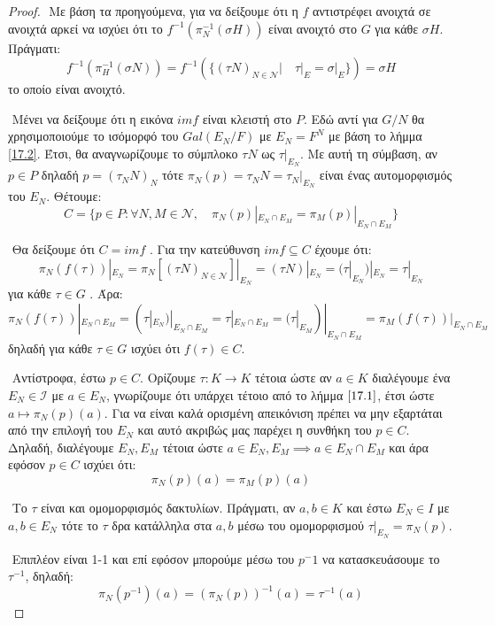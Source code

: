 \documentclass[oneside,a4paper]{article}
\begin{document}
\begin{proof}
$ $\newline
\noindent Με βάση τα προηγούμενα, για να δείξουμε ότι η $f$ αντιστρέφει ανοιχτά σε ανοιχτά αρκεί να ισχύει ότι το $f^{-1} (\pi^{-1}_N (\sigma H))$ είναι ανοιχτό στο $G$ για κάθε $\sigma H$. Πράγματι:
$$f^{-1} (\pi^{-1}_H (\sigma N)) = f^{-1} (\{(\tau N)_{N \in \mathcal{N}} | \quad \tau|_E = \sigma|_E \}) = \sigma H$$
το οποίο είναι ανοιχτό.

$ $\newline
\noindent Μένει να δείξουμε ότι η εικόνα $imf$ είναι κλειστή στο $P$. Εδώ αντί για $G/N$ θα χρησιμοποιούμε το ισόμορφό του $Gal(E_N / F)$ με $E_N = F^N$ με βάση το λήμμα \ref{17.2}. Έτσι, θα αναγνωρίζουμε το σύμπλοκο $\tau N$ ως $\tau|_{E_N}$. Με αυτή τη σύμβαση, αν $p \in P$ δηλαδή $p = (\tau_N N)_{N}$ τότε $\pi_N (p) = \tau_N N = \tau_N |_{E_N}$ είναι ένας αυτομορφισμός του $E_N$. Θέτουμε:
$$C = \{ p \in P: \forall N,M \in \mathcal{N} ,\quad \pi_N (p) |_{E_N \cap E_M} = \pi_M(p)|_{E_N \cap E_M}\}$$

$ $\newline
\noindent Θα δείξουμε ότι $C=imf$ . Για την κατεύθυνση $imf \subseteq C$ έχουμε ότι:
$$\pi_N (f(\tau))|_{E_N} =\pi_N [(\tau N)_{N \in \mathcal{N}}]|_{E_N} = (\tau N) |_{E_N} = (\tau|_{E_N})|_{E_N} = \tau|_{E_N}$$
για κάθε $\tau \in G$ . Άρα:
$$\pi_N (f(\tau))|_{E_N \cap E_M}=(\tau|_{E_N})|_{E_N \cap E_M} = \tau|_{E_N \cap E_M} = (\tau|_{E_M})|_{E_N \cap E_M} =\pi_M (f(\tau))|_{E_N \cap E_M}$$
δηλαδή για κάθε $\tau \in G$ ισχύει ότι $f(\tau) \in C$.

$ $\newline
\noindent Αντίστροφα, έστω $p \in C$. Ορίζουμε $\tau : K \rightarrow K$ τέτοια ώστε αν $a \in K$ διαλέγουμε ένα $E_N \in \mathcal{I}$ με $a \in E_N$, γνωρίζουμε ότι υπάρχει τέτοιο από το λήμμα $\ref{17.1}$, έτσι ώστε $a \mapsto \pi_N (p) (a)$. Για να είναι καλά ορισμένη απεικόνιση πρέπει να μην εξαρτάται από την επιλογή του $E_N$ και αυτό ακριβώς μας παρέχει η συνθήκη του $p \in C$.  Δηλαδή, διαλέγουμε $E_N, E_M$ τέτοια ώστε $a \in E_N, E_M \implies a \in E_N \cap E_M$ και άρα εφόσον $p \in C$ ισχύει ότι:
$$\pi_N (p) (a) =  \pi_M (p) (a)$$
 
$ $\newline
\noindent Το $\tau$ είναι και ομομορφισμός δακτυλίων. Πράγματι, αν $a,b \in K$ και έστω $E_N \in I$ με $a,b \in E_N$ τότε το $\tau$ δρα κατάλληλα στα $a,b$ μέσω του ομομορφισμού $\tau|_{E_N} = \pi_N (p)$.

$ $\newline
\noindent Επιπλέον είναι 1-1 και επί εφόσον μπορούμε μέσω του $p^-1$ να κατασκευάσουμε το $\tau^{-1}$, δηλαδή:
$$\pi_N (p^{-1}) (a) = (\pi_N (p))^{-1} (a) = \tau^{-1} (a)$$



\end{proof}
\end{document}
